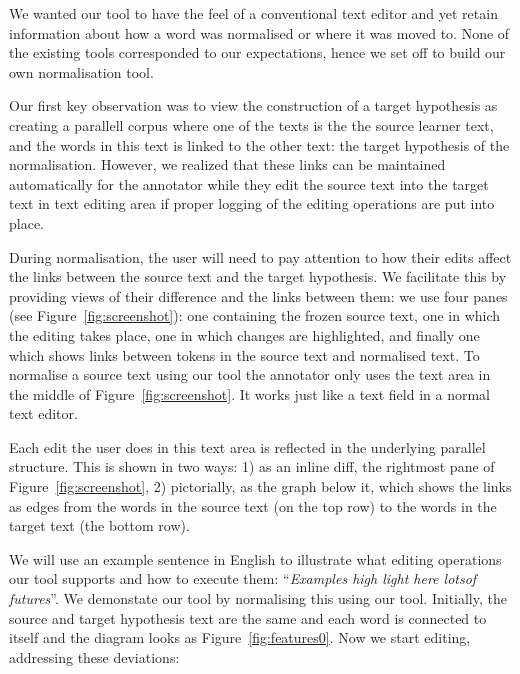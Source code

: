 \documentclass[10pt, a4paper]{article}
\begin{document}
We wanted our tool to have the feel of a conventional text editor and yet retain
information about how a word was normalised or where it was moved to. None of
the existing tools corresponded to our expectations, hence we set off to build
our own normalisation tool.

Our first key observation was to view the construction of a target hypothesis
as creating a parallell corpus where one of the texts is the the source learner
text, and the words in this text is linked to the other text: the target
hypothesis of the normalisation.
However, we realized that these links can be maintained automatically for
the annotator while they edit the source text into the target text in
text editing area if proper logging of the editing operations are put
into place.

During normalisation, the user will need to pay attention to how their edits affect
the links between the source text and the target hypothesis. We facilitate
this by providing views of their difference and the links between them:
we use four panes (see Figure~\ref{fig:screenshot}): one containing the
frozen source text, one in which the editing takes place, one in which
changes are highlighted, and finally one which shows links between tokens in the source text and normalised text.
To normalise a source text using our tool the annotator only uses
the text area in the middle of Figure~\ref{fig:screenshot}.
It works just like a text field in a normal text editor.

Each edit the user does in this text area is reflected in the underlying
parallel structure. This is shown in two ways:
1) as an inline diff, the rightmost pane of Figure~\ref{fig:screenshot},
2) pictorially, as the graph below it, which shows the links as edges from
the words in the source text (on the top row) to the words
in the target text (the bottom row).

We will use an example sentence in English to illustrate
what editing operations our tool supports and how to execute them:
``\emph{Examples high light here lotsof futures}''.
We demonstate our tool by normalising this using our tool.
Initially, the source and target hypothesis text are
the same and each word is connected to itself and the diagram looks as
Figure~\ref{fig:features0}. Now we start editing, addressing these
deviations:
\end{document}
